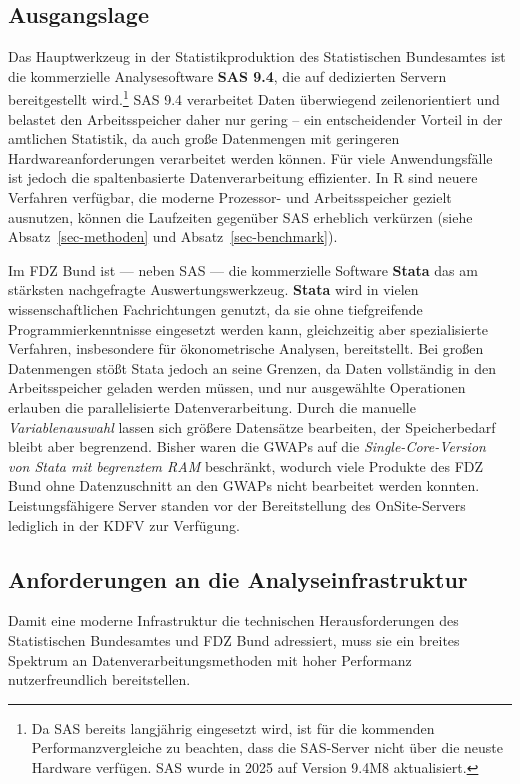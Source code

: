 \documentclass[
  german,
  10pt,
  twoside]{article}
\let\oldtextbf\textbf
\renewcommand{\textbf}[1]{{\color{wistaBlue}\oldtextbf{#1}}}
\let\oldref\ref
\renewcommand{\ref}[1]{\oldref{#1}\raisebox{-0.2ex}{\scriptsize\color{wistaBlue}\ding{247}}}
\begin{document}
\subsection{Ausgangslage}\label{ausgangslage}

Das Hauptwerkzeug in der Statistikproduktion des Statistischen
Bundesamtes ist die kommerzielle Analysesoftware \textbf{SAS 9.4}, die
auf dedizierten Servern bereitgestellt wird.\footnote{Da SAS bereits
  langjährig eingesetzt wird, ist für die kommenden Performanzvergleiche
  zu beachten, dass die SAS-Server nicht über die neuste Hardware
  verfügen. SAS wurde in 2025 auf Version 9.4M8 aktualisiert.} SAS 9.4
verarbeitet Daten überwiegend zeilenorientiert und belastet den
Arbeitsspeicher daher nur gering -- ein entscheidender Vorteil in der
amtlichen Statistik, da auch große Datenmengen mit geringeren
Hardwareanforderungen verarbeitet werden können. Für viele
Anwendungsfälle ist jedoch die spaltenbasierte Datenverarbeitung
effizienter. In R sind neuere Verfahren verfügbar, die moderne
Prozessor- und Arbeitsspeicher gezielt ausnutzen, können die Laufzeiten
gegenüber SAS erheblich verkürzen (siehe Absatz~\ref{sec-methoden} und
Absatz~\ref{sec-benchmark}).

Im FDZ Bund ist --- neben SAS --- die kommerzielle Software
\textbf{Stata} das am stärksten nachgefragte Auswertungswerkzeug.
\textbf{Stata} wird in vielen wissenschaftlichen Fachrichtungen genutzt,
da sie ohne tiefgreifende Programmierkenntnisse eingesetzt werden kann,
gleichzeitig aber spezialisierte Verfahren, insbesondere für
ökonometrische Analysen, bereitstellt. Bei großen Datenmengen stößt
Stata jedoch an seine Grenzen, da Daten vollständig in den
Arbeitsspeicher geladen werden müssen, und nur ausgewählte Operationen
erlauben die parallelisierte Datenverarbeitung. Durch die manuelle
\emph{Variablenauswahl} lassen sich größere Datensätze bearbeiten, der
Speicherbedarf bleibt aber begrenzend. Bisher waren die GWAPs auf die
\emph{Single-Core-Version von Stata mit begrenztem RAM} beschränkt,
wodurch viele Produkte des FDZ Bund ohne Datenzuschnitt an den GWAPs
nicht bearbeitet werden konnten. Leistungsfähigere Server standen vor
der Bereitstellung des OnSite-Servers lediglich in der KDFV zur
Verfügung.

\subsection{Anforderungen an die
Analyseinfrastruktur}\label{sec-infra-anf}

Damit eine moderne Infrastruktur die technischen Herausforderungen des
Statistischen Bundesamtes und FDZ Bund adressiert, muss sie ein breites
Spektrum an Datenverarbeitungsmethoden mit hoher Performanz
nutzerfreundlich bereitstellen.
\end{document}
